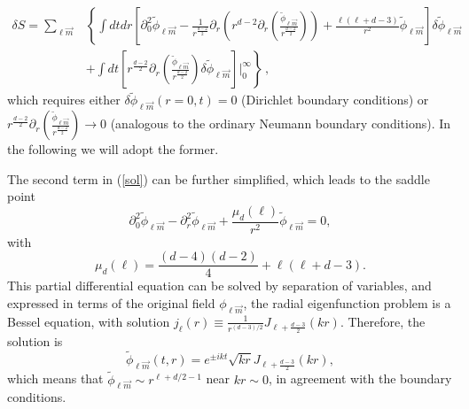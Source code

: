 \documentclass[12pt,a4paper]{article}
\begin{document}
\begin{equation}\label{sol}
\begin{split}
\delta S= \sum_{\ell\vec{m}}&\left\{\int dt dr \left[\partial_0^2 \widetilde{\phi}_{\ell\vec{m}}-\frac{1}{r^{\frac{d-2}{2}}}\partial_r \left(r^{d-2} \partial_r\left(\frac{\widetilde{\phi}_{\ell\vec{m}}}{r^{\frac{d-2}{2}}}\right)\right)+\frac{\ell(\ell+d-3)}{r^2}\widetilde{\phi}_{\ell\vec{m}}\right]\delta {\widetilde{\phi}}_{\ell\vec{m}}\right.\\
& \left.+ \int dt\left[r^{\frac{d-2}{2}}\partial_r \left(\frac{\widetilde{\phi}_{\ell\vec{m}}}{r^{\frac{d-2}{2}}}\right)\delta{\widetilde{\phi}}_{\ell\vec{m}}\right]\Biggr\rvert_0^{\infty}\right\}\, ,
\end{split}
\end{equation}
which requires either $\delta \widetilde{\phi}_{\ell\vec{m}}(r=0,t)=0$ (Dirichlet boundary conditions) or $r^{\frac{d-2}{2}}\partial_r \left(\frac{\widetilde{\phi}_{\ell\vec{m}}}{r^{\frac{d-2}{2}}}\right)\rightarrow 0$ (analogous to the ordinary Neumann boundary conditions). In the following we will adopt the former.

The second term in (\ref{sol}) can be further simplified, which leads to the saddle point
\begin{equation}
\partial_0^2 \widetilde{\phi}_{\ell\vec{m}}-\partial_r^2 \widetilde{\phi}_{\ell\vec{m}}+\frac{\mu_d(\ell)}{r^2}\widetilde{\phi}_{\ell\vec{m}}=0,
\end{equation}
with 
\begin{equation}
\mu_d(\ell)=\frac{(d-4)(d-2)}{4}+\ell(\ell+d-3).
\end{equation}
This partial differential equation can be solved by separation of variables, and expressed in terms of the original field $\phi_{\ell\vec{m}}$, the radial eigenfunction problem is a Bessel equation, with solution $j_{\ell}(r)\equiv \frac{1}{r^{(d-3)/2}}J_{\ell+\frac{d-3}{2}}(k r)$. Therefore, the solution is
\begin{equation}\label{classical}
\widetilde{\phi}_{\ell\vec{m}}(t,r)=e^{\pm i k t}\sqrt{k r}J_{\ell+\frac{d-3}{2}}(k r),
\end{equation}
which means that $\widetilde{\phi}_{\ell\vec{m}}\sim r^{\ell +d/2-1}$ near $k r\sim 0$, in agreement with the boundary conditions.
\end{document}
